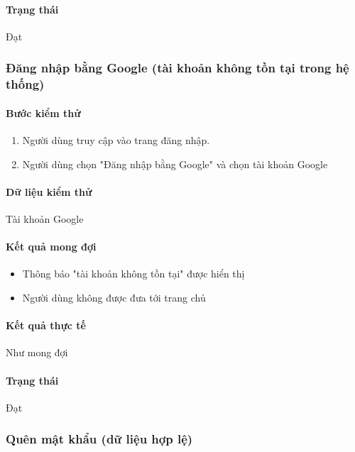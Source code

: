 \documentclass[./../main.tex]{subfiles}
\begin{document}
\paragraph*{Trạng thái} Đạt

\subsubsection{Đăng nhập bằng Google (tài khoản không tồn tại trong hệ thống)}

\paragraph*{Bước kiểm thử}

\begin{enumerate}
    \item Người dùng truy cập vào trang đăng nhập.
    \item Người dùng chọn "Đăng nhập bằng Google" và chọn tài khoản Google
\end{enumerate}

\paragraph*{Dữ liệu kiểm thử} Tài khoản Google

\paragraph*{Kết quả mong đợi}

\begin{itemize}
    \item Thông báo "tài khoản không tồn tại" được hiển thị
    \item Người dùng không được đưa tới trang chủ
\end{itemize}

\paragraph*{Kết quả thực tế} Như mong đợi

\paragraph*{Trạng thái} Đạt

\subsubsection{Quên mật khẩu (dữ liệu hợp lệ)}
\end{document}

